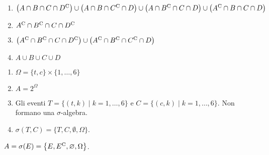 \Soluzione

\begin{enumerate}
	\item $\left( A\cap B\cap C\cap D^{\mathrm{C}}\right) \cup \left( A\cap B\cap C^{\mathrm{C}} \cap D\right) \cup \left( A\cap B^{\mathrm{C}} \cap C\cap D\right) \cup \left( A^{\mathrm{C}} \cap B\cap C\cap D\right)$
	\item $A^{\mathrm{C}} \cap B^{\mathrm{C}} \cap C\cap D^{\mathrm{C}}$
	\item $\left( A^{\mathrm{C}} \cap B^{\mathrm{C}} \cap C\cap D^{\mathrm{C}}\right) \cup \left( A^{\mathrm{C}} \cap B^{\mathrm{C}} \cap C^{\mathrm{C}} \cap D\right)$
	\item $A\cup B\cup C\cup D$
\end{enumerate}

\Soluzione

\begin{enumerate}
	\item $\Omega =\{t,c\} \times \{1,\dots ,6\}$
	\item $A=2^{\Omega }$
	\item Gli eventi $T=\{(t,k) \mid k=1,\dots ,6\}$ e $C=\{(c,k) \mid k=1,\dots ,6\}$. Non formano una $\sigma $-algebra.
	\item $\sigma (T,C) =\{T,C,\emptyset ,\Omega \}$.
\end{enumerate}

\Soluzione

$A=\sigma ( E) =\left\{E,E^{\mathrm{C}} ,\varnothing ,\Omega \right\}$.

\Soluzione

